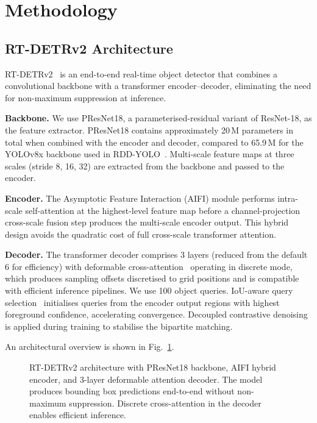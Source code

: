 \documentclass[conference]{IEEEtran}
\begin{document}
\section{Methodology}
\label{sec:method}

\subsection{RT-DETRv2 Architecture}

RT-DETRv2~\cite{chen2024rtdetrv2} is an end-to-end real-time object detector that
combines a convolutional backbone with a transformer encoder--decoder, eliminating the
need for non-maximum suppression at inference.

\textbf{Backbone.}
We use PResNet18, a parameterised-residual variant of ResNet-18, as the feature
extractor.
PResNet18 contains approximately 20\,M parameters in total when combined with the
encoder and decoder, compared to 65.9\,M for the YOLOv8x backbone used in
RDD-YOLO~\cite{rddyolo}.
Multi-scale feature maps at three scales (stride 8, 16, 32) are extracted from the
backbone and passed to the encoder.

\textbf{Encoder.}
The Asymptotic Feature Interaction (AIFI) module performs intra-scale self-attention
at the highest-level feature map before a channel-projection cross-scale fusion step
produces the multi-scale encoder output.
This hybrid design avoids the quadratic cost of full cross-scale transformer
attention.

\textbf{Decoder.}
The transformer decoder comprises 3 layers (reduced from the default 6 for
efficiency) with deformable cross-attention~\cite{zhu2021deformable} operating in
discrete mode, which produces sampling offsets discretised to grid positions and is
compatible with efficient inference pipelines.
We use 100 object queries.
IoU-aware query selection~\cite{chen2024rtdetrv2} initialises queries from the
encoder output regions with highest foreground confidence, accelerating convergence.
Decoupled contrastive denoising is applied during training to stabilise the
bipartite matching.

An architectural overview is shown in Fig.~\ref{fig:architecture}.

\begin{figure}[t]
  \centering
  \resizebox{\columnwidth}{!}{}
  \caption{RT-DETRv2 architecture with PResNet18 backbone, AIFI hybrid encoder,
           and 3-layer deformable attention decoder. The model produces
           bounding box predictions end-to-end without non-maximum suppression.
           Discrete cross-attention in the decoder enables efficient inference.}
  \label{fig:architecture}
\end{figure}
\end{document}
